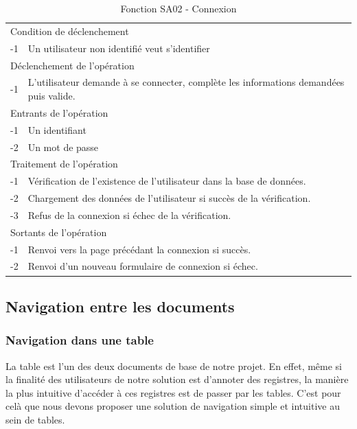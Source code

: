 \documentclass[a4paper]{article}
\begin{document}
\begin{table}[H]
  \centering
   \small
	\begin{tabular}{|c|p{12cm}|}
   		\hline
   			\rowcolor{lightgray}\multicolumn{2}{|c|}{\textbf{Fonction SA02 - Connexion}} \\
   		\hline
   			\multicolumn{2}{|l|}{Condition de déclenchement} \\
   		\hline
   			-1 & Un utilisateur non identifié veut s'identifier\\
   		\hline
   			\multicolumn{2}{|l|}{Déclenchement de l'opération} \\
   		\hline
   			-1 & L'utilisateur demande à se connecter, complète les informations demandées puis valide.\\
   		\hline
   			\multicolumn{2}{|l|}{Entrants de l'opération} \\
   		\hline
   			-1 & Un identifiant\\
        	-2 & Un mot de passe\\
   		\hline
   			\multicolumn{2}{|l|}{Traitement de l'opération} \\
  		\hline
   			-1 & Vérification de l’existence de l'utilisateur dans la base de données.\\
        	-2 & Chargement des données de l'utilisateur si succès de la vérification.\\
        	-3 & Refus de la connexion si échec de la vérification.\\
   		\hline
   			\multicolumn{2}{|l|}{Sortants de l'opération} \\
   		\hline
   			-1 & Renvoi vers la page précédant la connexion si succès.\\
            -2 & Renvoi d'un nouveau formulaire de connexion si échec.\\
   		\hline
	\end{tabular}
  \caption{Fonction SA02 - Connexion}
  \normalsize
  \label{tab: connexion}
\end{table}


\subsection{Navigation entre les documents}

\subsubsection{Navigation dans une table}

La table est l'un des deux documents de base de notre projet. En effet, même si la finalité des utilisateurs de notre solution est d'annoter des registres, la manière la plus intuitive d'accéder à ces registres est de passer par les tables. C'est pour celà que nous devons proposer une solution de navigation simple et intuitive au sein de tables.
\end{document}
